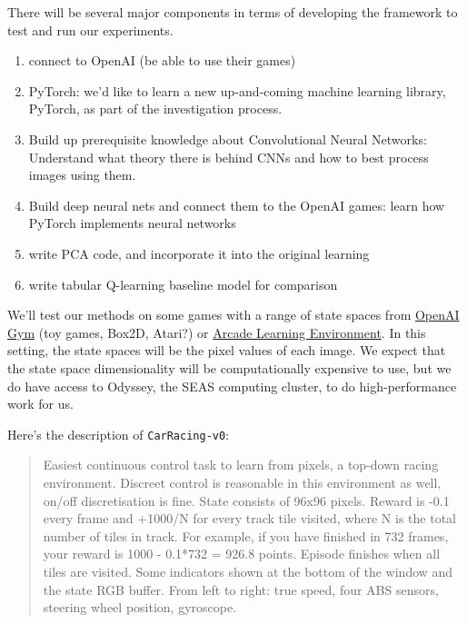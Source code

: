 \documentclass[11pt]{article}
\begin{document}




There will be several major components in terms of developing the framework to test and run our experiments.

\begin{enumerate}
\item connect to OpenAI (be able to use their games)
\item PyTorch: we'd like to learn a new up-and-coming machine learning library, PyTorch, as part of the investigation process.
\item Build up prerequisite knowledge about Convolutional Neural Networks: Understand what theory there is behind CNNs and how to best process images using them.
\item Build deep neural nets and connect them to the OpenAI games: learn how PyTorch implements neural networks
\item write PCA code, and incorporate it into the original learning
\item write tabular Q-learning baseline model for comparison
\end{enumerate}

We'll test our methods on some games with a range of state spaces from \href{https://gym.openai.com/docs/}{OpenAI Gym} (toy games, Box2D, Atari?) \cite{brockman2016openai} or \href{https://github.com/mgbellemare/Arcade-Learning-Environment}{Arcade Learning Environment}. In this setting, the state spaces will be the pixel values of each image. We expect that the state space dimensionality will be computationally expensive to use, but we do have access to Odyssey, the SEAS computing cluster, to do high-performance work for us.

Here's the description of \texttt{CarRacing-v0}:
\begin{quote}
Easiest continuous control task to learn from pixels, a top-down racing environment. Discreet control is reasonable in this environment as well, on/off discretisation is fine. State consists of 96x96 pixels. Reward is -0.1 every frame and +1000/N for every track tile visited, where N is the total number of tiles in track. For example, if you have finished in 732 frames, your reward is 1000 - 0.1*732 = 926.8 points. Episode finishes when all tiles are visited. Some indicators shown at the bottom of the window and the state RGB buffer. From left to right: true speed, four ABS sensors, steering wheel position, gyroscope.   
\end{quote}
\end{document}
